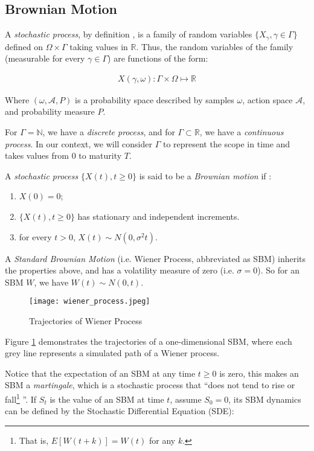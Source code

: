 \subsection{Brownian Motion}

A \textit{stochastic process}, by definition \cite{Iacus2008}, is a family of random variables $\{X_\gamma,\gamma\in\Gamma\}$ defined on $\Omega\times\Gamma$ taking values in $\mathbb{R}$. Thus, the random variables of the family (measurable for every $\gamma\in\Gamma$) are functions of the form:

\begin{align*}
X(\gamma,\omega):\Gamma\times\Omega\mapsto\mathbb{R}
\end{align*}

Where $(\omega,\mathcal{A},P)$ is a probability space described by samples $\omega$, action space $\mathcal{A}$, and probability measure $P$.

For $\Gamma=\mathbb{N}$, we have a \textit{discrete process}, and for $\Gamma\subset\mathbb{R}$, we have a \textit{continuous process}. In our context, we will consider $\Gamma$ to represent the scope in time and takes values from $0$ to maturity $T$.

A \textit{stochastic process} $\{X(t), t\geq 0\}$ is said to be a \textit{Brownian motion} if \cite{Iacus2008}:

\begin{enumerate}
	\item $X(0)=0$;
	\item $\{X(t),t\geq0\}$ has stationary and independent increments.
	\item for every $t>0$, $X(t)\sim N(0,\sigma^2 t)$.
\end{enumerate}

A \textit{Standard Brownian Motion} (i.e. Wiener Process, abbreviated as SBM) inherits the properties above, and has a volatility measure of zero (i.e. $\sigma=0$). So for an SBM $W$, we have $W(t) \sim N(0,t)$.

\begin{figure}[H]
	\centering
	\texttt{[image: wiener\_process.jpeg]}
	\caption{Trajectories of Wiener Process} \label{img:wiener_process}
\end{figure}

Figure \ref{img:wiener_process} demonstrates the trajectories of a one-dimensional SBM, where each grey line represents a simulated path of a Wiener process.

Notice that the expectation of an SBM at any time $t\geq0$ is zero, this makes an SBM a \textit{martingale}, which is a stochastic process that ``does not tend to rise or fall\footnote{That is, $E[W(t+k)]=W(t)$ for any $k$.} \cite{Shreve2004}''. If $S_t$ is the value of an SBM at time $t$, assume $S_0=0$, its SBM dynamics can be defined by the Stochastic Differential Equation (SDE):

